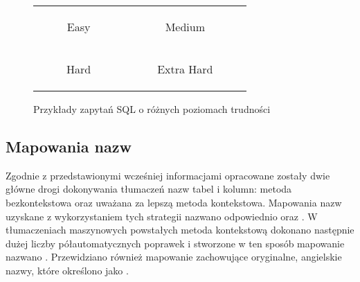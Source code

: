 \begin{figure}[ht]
\begin{tabular}{cc}
\begin{subfigure}{0.48\textwidth}
    \begin{minipage}{\linewidth}
        
    \end{minipage}
    \caption{Easy}
\end{subfigure}
&
\begin{subfigure}{0.48\textwidth}
    \begin{minipage}{\linewidth}
        
    \end{minipage}
    \caption{Medium}
\end{subfigure}
\\
  \begin{subfigure}{0.48\textwidth}
    \begin{minipage}{\linewidth}
        
    \end{minipage}
    \caption{Hard}
\end{subfigure}
&
\begin{subfigure}{0.48\textwidth}
    \begin{minipage}{\linewidth}
        
    \end{minipage}
    \caption{Extra Hard}
\end{subfigure}
\end{tabular}
\caption{Przykłady zapytań SQL o różnych poziomach trudności}
\label{fig:sql-difficulties}
\end{figure}

\subsection{Mapowania nazw}
Zgodnie z przedstawionymi wcześniej informacjami opracowane zostały dwie główne drogi dokonywania tłumaczeń nazw tabel i kolumn: metoda bezkontekstowa oraz uważana za lepszą metoda kontekstowa. Mapowania nazw uzyskane z wykorzystaniem tych strategii nazwano odpowiednio  oraz . W tłumaczeniach maszynowych powstałych metoda kontekstową dokonano następnie dużej liczby półautomatycznych poprawek i stworzone w ten sposób mapowanie nazwano . Przewidziano również mapowanie zachowujące oryginalne, angielskie nazwy, które określono jako .

